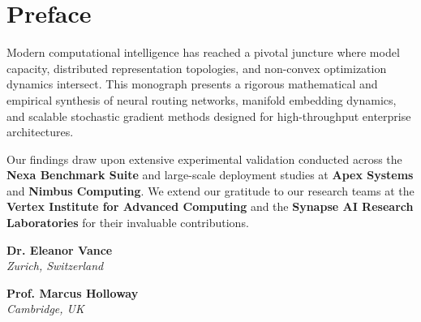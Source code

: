 \documentclass[
  11pt,
  a4paper,
  twoside=true,
  headsepline=0.8pt,
  footsepline=false,
  open=right,
  numbers=noenddot,
  chapterprefix=false,
  BCOR=6mm
]{scrbook}
\begin{document}
\thispagestyle{empty}
\vspace*{10cm}
\cleardoublepage

\tableofcontents
\cleardoublepage

\chapter*{Preface}

Modern computational intelligence has reached a pivotal juncture where model capacity, distributed representation topologies, and non-convex optimization dynamics intersect. This monograph presents a rigorous mathematical and empirical synthesis of neural routing networks, manifold embedding dynamics, and scalable stochastic gradient methods designed for high-throughput enterprise architectures.

Our findings draw upon extensive experimental validation conducted across the \textbf{Nexa Benchmark Suite} and large-scale deployment studies at \textbf{Apex Systems} and \textbf{Nimbus Computing}. We extend our gratitude to our research teams at the \textbf{Vertex Institute for Advanced Computing} and the \textbf{Synapse AI Research Laboratories} for their invaluable contributions.

\vspace{1.5em}
\noindent
\begin{minipage}{0.48\textwidth}
  \textbf{Dr. Eleanor Vance}\\
  \textit{Zurich, Switzerland}
\end{minipage}
\hfill
\begin{minipage}{0.48\textwidth}
  \raggedleft
  \textbf{Prof. Marcus Holloway}\\
  \textit{Cambridge, UK}
\end{minipage}
\end{document}
